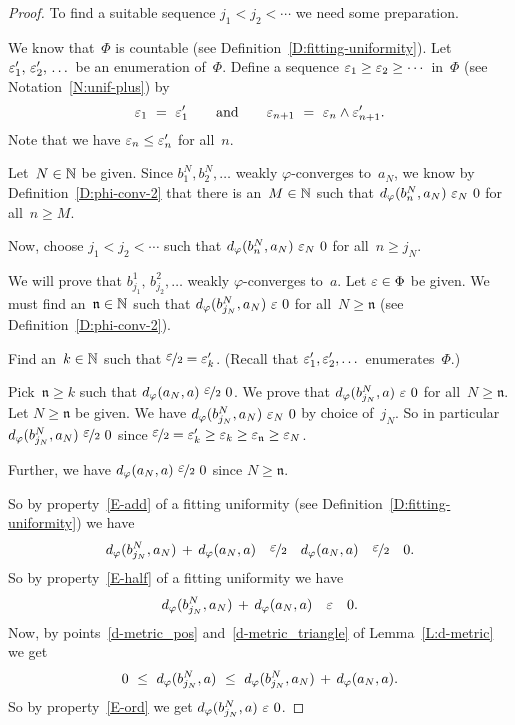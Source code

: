 \documentclass[main.tex]{subfiles}
\begin{document}
\begin{proof}
To find a suitable sequence $j_1 < j_2 <\dotsb$ we need some preparation.

We know that~$\Phi$ is countable
(see Definition~\ref{D:fitting-uniformity}).
Let $\varepsilon_1',\,\varepsilon_2',\,\dotsc$ be an enumeration of~$\Phi$.
Define a sequence $\varepsilon_1 \geq \varepsilon_2 \geq \dotsb$ in~$\Phi$
(see Notation~\ref{N:unif-plus})
by 
\begin{equation*}
\varepsilon_1 \ = \ \varepsilon_1'
\qquad\text{and}\qquad 
\varepsilon_{n+1} \ =\ \varepsilon_n \wedge \varepsilon_{n+1}'.
\end{equation*}
Note that we have $\varepsilon_n \leq \varepsilon_n'$ for all~$n$.

Let~$N\in\mathbb{N}$ be given.
Since $b^N_1,b^N_2,\dotsc$ weakly $\varphi$-converges to~$a_N$,
we know by Definition~\ref{D:phi-conv-2} that there is an~$M\in\mathbb{N}$
such that $\ld\varphi(b^N_n, a_N)\ \ve_N\ 0$
for all~$n\geq M$.

Now,
choose $j_1<j_2<\dotsb$ such that 
$\ld\varphi(b^N_n, a_N)\ \ve_N\ 0$
for all~$n\geq j_N$.

We will prove that $b^1_{j_1},\,b^2_{j_2},\dotsc$ weakly $\varphi$-converges
to~$a$.
Let $\varepsilon\in\Phi$ be given.
We must find an~$\mathfrak{n}\in\mathbb{N}$
such that $d_{\smash{\varphi}}(b^N_{j_N},a_N) \ \varepsilon\ 0$
for all~$N\geq \mathfrak{n}$
(see Definition~\ref{D:phi-conv-2}).

Find an~$k\in\mathbb{N}$ such that $\smash{\nicefrac{\textstyle{\varepsilon}}{2}} = \varepsilon_k'$.
(Recall that $\varepsilon_1',\varepsilon_2',\dotsc$ enumerates~$\Phi$.)

Pick~$\mathfrak{n}\geq k$
such that $\ld\varphi(a_N,a) \ \dt\ve\ 0$.
We prove that $d_{\smash{\varphi}}(b_{j_N}^N,a) \ \varepsilon\ 0$
for all~$N\geq \mathfrak{n}$.
Let $N\geq\mathfrak{n}$ be given.
We have $\ld\varphi(b^N_{j_N},a_N) \ \ve_N \ 0$
by choice of~$j_N$.
So in particular $\ld\varphi(b^N_{j_N},a_N) \ \dt\ve \ 0$
since $\smash{\nicefrac{\textstyle{\varepsilon}}{2}} = \varepsilon_k'\geq\varepsilon_k \geq \varepsilon_{\mathfrak{n}} \geq \varepsilon_N$.

Further,
we have $\ld\varphi(a_N,a) \ \dt\ve\ 0$
since $N\geq \mathfrak{n}$.

So by property~\ref{E-add} 
of a fitting uniformity (see Definition~\ref{D:fitting-uniformity})
we have
\begin{equation*}
d_{\smash{\varphi}}(b_{j_N}^N,a_N) \,+\,  d_{\smash{\varphi}}(a_N,a) 
\quad\smash{\nicefrac{\textstyle{\varepsilon}}{2}}\quad 
d_{\smash{\varphi}}(a_N,a)
\quad\smash{\nicefrac{\textstyle{\varepsilon}}{2}}\quad
0.
\end{equation*}
So by property~\ref{E-half} of a fitting uniformity
we have
\begin{equation*}
d_{\smash{\varphi}}(b_{j_N}^N,a_N) \,+\,  d_{\smash{\varphi}}(a_N,a) 
\quad\varepsilon\quad 
0.
\end{equation*}
Now,
by points~\ref{d-metric_pos} and~\ref{d-metric_triangle}
of Lemma~\ref{L:d-metric}
we get
\begin{equation*}
0 \ \leq\ 
\ld\varphi(b_{j_N}^N, a) \ \leq\ 
\ld\varphi(b_{j_N}^N,a_N) \,+\,  \ld\varphi(a_N,a).
\end{equation*}
So by property~\ref{E-ord} we get $d_{\smash{\varphi}}(b^N_{j_N},a) \ \varepsilon\ 0$.
\end{proof}
\end{document}
